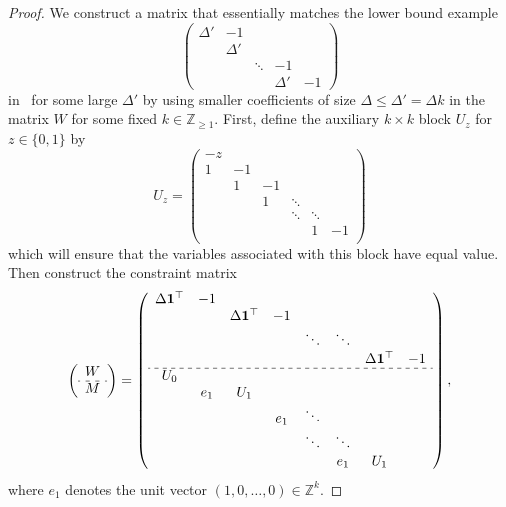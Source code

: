 \documentclass[a4paper,UKenglish,cleveref,thm-restate]{lipics-v2021}
\newcommand{\Z}{\mathbb Z}
\newcommand{\vecone}{\mathbf1}
\begin{document}
{\begin{proof}
    We construct a matrix that essentially matches the lower bound example
    \[
        \begin{pmatrix}
            \Delta'&-1&&\\
            &\Delta'&&\\
            &&\ddots&-1&\\
            &&&\Delta'&-1
        \end{pmatrix}
    \]
    in~\cite{DBLP:conf/ipco/HunkenschroderKKLL24} for some large $\Delta'$ by using smaller coefficients of size $\Delta\le\Delta'=\Delta k$ in the matrix $W$ for some fixed $k\in\Z_{\ge1}$. First, define the auxiliary $k\times k$ block $U_z$ for $z\in\{0,1\}$ by
    \begin{equation}
        U_z=\begin{pmatrix}
            -z&&&&&\\
            1&-1&&&&\\
            &1&-1&&&\\
            &&1&\ddots&&\\
            &&&\ddots&\ddots&\\
            &&&&1&-1\\
        \end{pmatrix}
        \label{eq:U_z}
    \end{equation}
    which will ensure that the variables associated with this block have equal value. Then construct the constraint matrix
    \begin{equation}
        \left(\begin{array}{c}
            W\\
            \cdashline{1-1}[3pt/3pt]
            M
        \end{array}\right)
        =
        \left(\begin{array}{c c c c c c c c}
            \Delta\vecone^\top&-1&&&&&&\\
            &&\Delta\vecone^\top&-1&&&&\\
            &&&&\ddots&\ddots&&\\
            &&&&&&\Delta\vecone^\top&-1\\
            \cdashline{1-8}[3pt/3pt]
            U_0&&&&&&&\\
            &e_1&U_1&&&&&\\
            &&&e_1&\ddots&&&\\
            &&&&\ddots&\ddots&&\\
            &&&&&e_1&U_1&\\
        \end{array}\right),
        \label{eq:graver-lb-wide}
    \end{equation}
    where $e_1$ denotes the unit vector $(1,0,\dots,0)\in\Z^k$.
    

\end{proof}}
\end{document}
